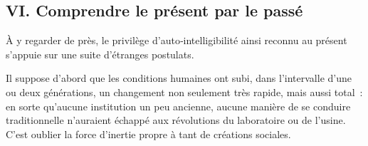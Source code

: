 \documentclass[french,twoside]{book} %
\newcommand{\astermono}{\medskip\centerline{\color{rubric}\large\selectfont{\syms ✻}}\medskip\par}%
\begin{document}
\subsection[{VI. Comprendre le présent par le passé}]{VI. Comprendre le présent par le passé}
\noindent À y regarder de près, le privilège d’auto‑intelligibilité ainsi reconnu au présent s’appuie sur une suite d’étranges postulats.\par
Il suppose d’abord que les conditions humaines ont subi, dans l’intervalle d’une ou deux générations, un changement non seulement très rapide, mais aussi total : en sorte qu’aucune institution un peu ancienne, aucune manière de se conduire traditionnelle n’auraient échappé aux révolutions du laboratoire ou de l’usine. C’est oublier la force d’inertie propre à tant de créations sociales.\par

\astermono
\end{document}
